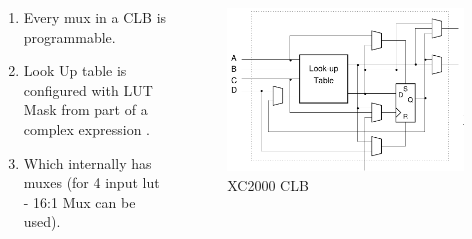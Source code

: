\documentclass{beamer}
\begin{document}
{\begin{frame}[fragile]
  \begin{columns}
   \begin{column}{0.5\textwidth}
     \begin{enumerate}
     	\item Every mux in a CLB is programmable.
	\item Look Up table is configured with LUT Mask from part of a complex expression .
	\item Which internally has muxes (for 4 input lut - 16:1 Mux can be used).
     \end{enumerate}
    \end{column}
   \begin{column}{0.5\textwidth}		
   \begin{figure}[h]
       \centering
       \includegraphics[width=1\linewidth]{images/xc2000clb.png} 
       \caption{XC2000 CLB}
       \label{exa_block}
    \end{figure}
   \end{column}
   \end{columns}
\end{frame}

}
\end{document}
